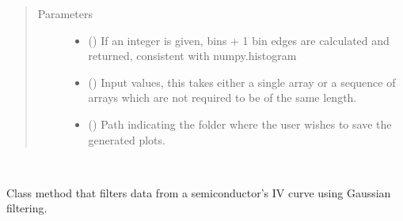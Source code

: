 \documentclass[letterpaper,10pt,english,openany, oneside]{sphinxmanual}
\begin{document}
\begin{fulllineitems}
\begin{fulllineitems}
\begin{fulllineitems}
\end{fulllineitems}

\begin{quote}\begin{description}
\item[{Parameters}] \leavevmode\begin{itemize}
\item {} 
 () \textendash{} If an integer is given, bins + 1 bin edges are calculated and returned, consistent with
numpy.histogram

\item {} 
 (\sphinxstyleliteralemphasis{\sphinxupquote{, }}\sphinxstyleliteralemphasis{\sphinxupquote{ (}}\sphinxstyleliteralemphasis{\sphinxupquote{,}}\sphinxstyleliteralemphasis{\sphinxupquote{)}}) \textendash{} Input values, this takes either a single array or a sequence of arrays
which are not required to be of the same length.

\item {} 
 (\sphinxstyleliteralemphasis{\sphinxupquote{, }}) \textendash{} Path indicating the folder where the user wishes to save the generated plots.

\end{itemize}

\end{description}\end{quote}

\end{fulllineitems}


\begin{fulllineitems}
\label{\detokenize{index:fompy.plots.plotter.iv}}~

\begin{fulllineitems}
Class method that filters data from a semiconductor’s IV curve using Gaussian filtering.


\end{fulllineitems}
\end{fulllineitems}
\end{fulllineitems}
\end{document}
